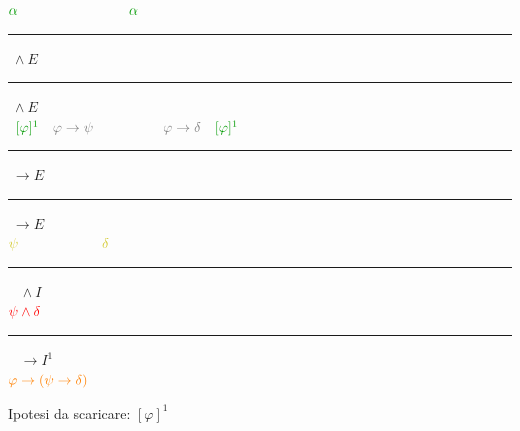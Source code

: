 \documentclass[a4paper, 12pt]{book}
\begin{document}
  \begin{center}

  \(
  \textcolor{green!60!black}{\alpha} \hspace{8em} \textcolor{green!60!black}{\alpha}
  \)\\[-0.5em]
  \hspace{0.9cm}\rule{1.2cm}{0.4pt}\(\; \land E\)\hspace{1.3cm}\rule{1.4cm}{0.4pt}\(\; \land E\)\\
  \(
  \hspace{0.5em}\textcolor{green!60!black}{[\varphi]^1} \quad \textcolor{gray}{\varphi \rightarrow \psi} \hspace{5em} \textcolor{gray}{\varphi \rightarrow \delta} \quad \textcolor{green!60!black}{[\varphi]^1} 
  \)\\[-0.5em]
  \hspace{1cm}\rule{3cm}{0.4pt}\(\; \rightarrow E\)\hspace{0.5cm}\rule{3cm}{0.4pt}\(\; \rightarrow E\)\\
  \(
  \textcolor{yellow!80!black}{\psi} \hspace{6em} \textcolor{yellow!80!black}{\delta}
  \)\\[-0.5em]
  \hspace{1cm}\rule{3cm}{0.4pt}\(\;\;\; \land I\)\\
  \(
  \textcolor{red}{\psi \land \delta}
  \)\\[-0.5em]
  \hspace{1cm}\rule{3cm}{0.4pt}\(\;\;\; \rightarrow I^1\)\\
  \(
  \textcolor{orange}{\varphi \rightarrow (\psi \rightarrow \delta)}
  \)

  Ipotesi da scaricare: \([\varphi]^1\)
  \end{center}
\end{document}

